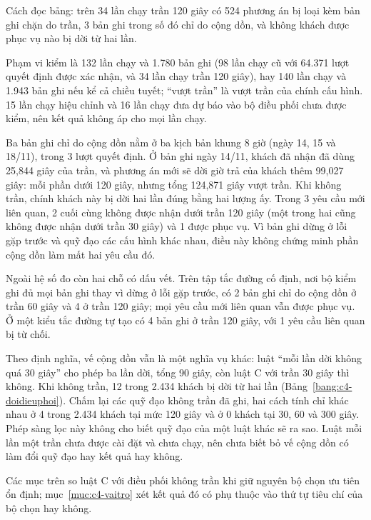 Cách đọc bảng: trên 34 lần chạy trần 120 giây có 524 phương án bị loại kèm bản ghi chặn do trần, 3 bản
ghi trong số đó chỉ do cộng dồn, và không khách được phục vụ nào bị dời từ hai lần.

Phạm vi kiểm là 132 lần chạy và 1.780 bản ghi (98 lần chạy cũ với 64.371 lượt quyết định được xác nhận,
và 34 lần chạy trần 120 giây), hay 140 lần chạy và 1.943 bản ghi nếu kể cả chiều tuyết; ``vượt trần'' là
vượt trần của chính cấu hình. 15 lần chạy hiệu chỉnh và 16 lần chạy đưa dự báo vào bộ điều phối chưa được
kiểm, nên kết quả không áp cho mọi lần chạy.

Ba bản ghi chỉ do cộng dồn nằm ở ba kịch bản khung 8 giờ (ngày 14, 15 và 18/11), trong 3 lượt quyết định.
Ở bản ghi ngày 14/11, khách đã nhận đã dùng 25,844 giây của trần, và phương án mới sẽ dời giờ trả của
khách thêm 99,027 giây: mỗi phần dưới 120 giây, nhưng tổng 124,871 giây vượt trần. Khi không trần, chính
khách này bị dời hai lần đúng bằng hai lượng ấy. Trong 3 yêu cầu mới liên quan, 2 cuối cùng không được
nhận dưới trần 120 giây (một trong hai cũng không được nhận dưới trần 30 giây) và 1 được phục vụ. Vì bản
ghi dừng ở lỗi gặp trước và quỹ đạo các cấu hình khác nhau, điều này không chứng minh phần cộng dồn làm
mất hai yêu cầu đó.

Ngoài hệ số đo còn hai chỗ có dấu vết. Trên tập tắc đường cố định, nơi bộ kiểm ghi đủ mọi bản ghi thay
vì dừng ở lỗi gặp trước, có 2 bản ghi chỉ do cộng dồn ở trần 60 giây và 4 ở trần 120 giây; mọi yêu cầu
mới liên quan vẫn được phục vụ. Ở một kiểu tắc đường tự tạo có 4 bản ghi ở trần 120 giây, với 1 yêu cầu
liên quan bị từ chối.

Theo định nghĩa, vế cộng dồn vẫn là một nghĩa vụ khác: luật ``mỗi lần dời không quá 30 giây'' cho phép
ba lần dời, tổng 90 giây, còn luật C với trần 30 giây thì không. Khi không trần, 12 trong 2.434 khách bị
dời từ hai lần (Bảng~\ref{bang:c4-doidieuphoi}). Chấm lại các quỹ đạo không trần đã ghi, hai cách tính
chỉ khác nhau ở 4 trong 2.434 khách tại mức 120 giây và ở 0 khách tại 30, 60 và 300 giây. Phép sàng lọc
này không cho biết quỹ đạo của một luật khác sẽ ra sao. Luật mỗi lần một trần chưa được cài đặt và chưa
chạy, nên chưa biết bỏ vế cộng dồn có làm đổi quỹ đạo hay kết quả hay không.

Các mục trên so luật C với điều phối không trần khi giữ nguyên bộ chọn ưu tiên ổn định;
mục~\ref{muc:c4-vaitro} xét kết quả đó có phụ thuộc vào thứ tự tiêu chí của bộ chọn hay không.
